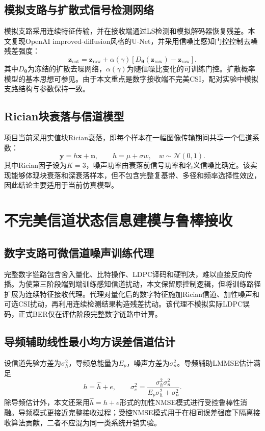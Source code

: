 \documentclass[UTF8,a4paper,11pt]{ctexart}
\newcommand{\CSI}{CSI}
\newcommand{\BER}{BER}
\newcommand{\NMSE}{NMSE}
\newcommand{\LDPC}{LDPC}
\begin{document}
\subsection{模拟支路与扩散式信号检测网络}
模拟支路采用连续特征传输，并在接收端通过LS检测和模拟解码器恢复残差。本文复现OpenAI improved-diffusion风格的U-Net，并采用信噪比感知门控控制去噪残差强度：
\begin{equation}
  \bm z_{\mathrm{out}}
  =\bm z_{\mathrm{raw}}
  +\alpha(\gamma)
  \left[D_{\bm\theta}(\bm z_{\mathrm{raw}})-\bm z_{\mathrm{raw}}\right].
  \label{eq:diff_gate}
\end{equation}
其中$D_{\bm\theta}$为冻结的扩散去噪网络，$\alpha(\gamma)$为随信噪比变化的可训练门控。扩散概率模型的基本思想可参见\cite{ho2020ddpm,nichol2021improved}。由于本文重点是数字接收端不完美\CSI{}，配对实验中模拟支路结构与参数保持一致。

\subsection{Rician块衰落与信道模型}
项目当前采用实值块Rician衰落，即每个样本在一幅图像传输期间共享一个信道系数：
\begin{equation}
  \bm y=h\bm x+\bm n,
  \qquad
  h=\mu+\sigma w,\quad w\sim\mathcal N(0,1).
  \label{eq:rician}
\end{equation}
其中Rician因子设为$K=3$，噪声功率由衰落前信号功率和名义信噪比确定。该实现能够体现块衰落和深衰落样本，但不包含完整复基带、多径和频率选择性效应，因此结论主要适用于当前仿真模型。

\section{不完美信道状态信息建模与鲁棒接收}
\subsection{数字支路可微信道噪声训练代理}
完整数字链路包含舍入量化、比特操作、\LDPC{}译码和硬判决，难以直接反向传播。为使第三阶段端到端训练感知信道扰动，本文保留原控制逻辑，但将训练路径扩展为连续特征接收代理。代理对量化后的数字特征施加Rician信道、加性噪声和可选\CSI{}扰动，再利用连续检测结果构造残差扰动。该代理不模拟实际\LDPC{}误码，正式\BER{}仅在评估阶段完整数字链路中计算。

\subsection{导频辅助线性最小均方误差信道估计}
设信道先验方差为$\sigma_h^2$，导频总能量为$E_p$，噪声方差为$\sigma_n^2$。导频辅助LMMSE估计满足
\begin{equation}
  h=\hat h+e,
  \qquad
  \sigma_e^2
  =\frac{\sigma_h^2\sigma_n^2}
  {E_p\sigma_h^2+\sigma_n^2}.
  \label{eq:lmmse_error}
\end{equation}
除导频估计外，本文还采用$\hat h=h+e$形式的加性\NMSE{}模式进行受控鲁棒性消融。导频模式更接近完整接收过程；受控\NMSE{}模式用于在相同误差强度下隔离接收算法贡献，二者不应混为同一类系统开销实验。
\end{document}
